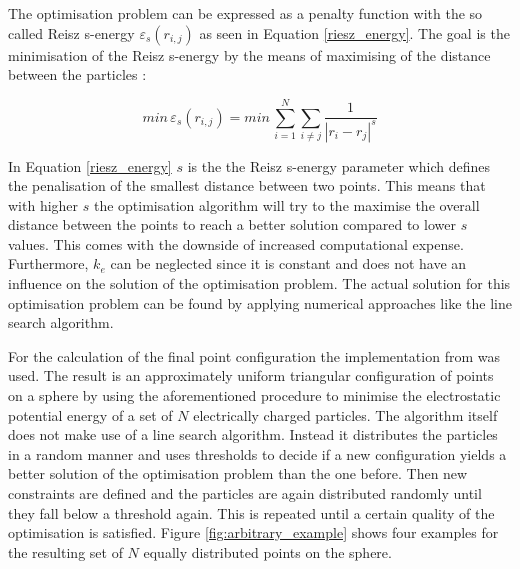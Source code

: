 The optimisation problem can be expressed as a penalty function with the so called Reisz s-energy $\varepsilon_s (r_{i,j})$ as seen in Equation \ref{riesz_energy}. The goal is the minimisation of the Reisz s-energy by the means of maximising of the distance between the particles \cite{ETAYOMINIMIZINGSPHERES}:

\begin{equation}
min\, \varepsilon_s (r_{i,j}) = min\, \sum_{i = 1}^{N}\sum_{i \neq j}^{}\frac{1}{{|r_{i}-r_{j}|}^s}
\label{riesz_energy}
\end{equation}

In Equation \ref{riesz_energy} $s$ is the the Reisz s-energy parameter which defines the penalisation of the smallest distance between two points. This means that with higher $s$ the optimisation algorithm will try to the maximise the overall distance between the points to reach a better solution compared to lower $s$ values. This comes with the downside of increased computational expense. Furthermore, $k_e$ can be neglected since it is constant and does not have an influence on the solution of the optimisation problem. The actual solution for this optimisation problem can be found by applying numerical approaches like the line search algorithm.

\medskip

For the calculation of the final point configuration the implementation from \cite{AntonSemechkoSuiteSphere} was used. The result is an approximately uniform triangular configuration of points on a sphere by using the aforementioned procedure to minimise the electrostatic potential energy of a set of $N$ electrically charged particles. The algorithm itself does not make use of a line search algorithm. Instead it distributes the particles in a random manner and uses thresholds to decide if a new configuration yields a better solution of the optimisation problem than the one before. Then new constraints are defined and the particles are again distributed randomly until they fall below a threshold again. This is repeated until a certain quality of the optimisation is satisfied. Figure \ref{fig:arbitrary_example} shows four examples for the resulting set of $N$ equally distributed points on the sphere.

